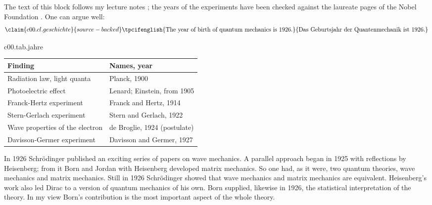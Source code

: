 \begin{vertiefung}[id=c00.v2,
    titel={Names and dates},
    wozu={The Core names the findings without their history. Here are the dates and names,
      for those who want to tell the story.},
    voraussetzung={Section~\ref{c00.s4}. The rest of the course does not need this block.},
    zurueck={The mathematical form of quantum mechanics and its statistical interpretation
      arose in the years 1925 to 1927.}]
  The text of this block follows my lecture notes ; the years of the experiments have been checked against the laureate pages of
  the Nobel Foundation . One can argue
  well:
  \begin{equation}\label{c00.eq.geburtsjahr}\claim{c00.cl.geschichte}{source-backed}
    \text{\tpcifenglish{The year of birth of quantum mechanics is 1926.}{Das Geburtsjahr der Quantenmechanik ist 1926.}}
  \end{equation}

  \begin{tpctable}{c00.tab.jahre}
    \caption{Dates and names for the findings of Section~\ref{c00.s4}. The years follow the
      laureate pages of the Nobel Foundation and, for Davisson and Germer, the year their
      paper appeared in the Physical Review.}
    \begin{tabular}{ll}
      \toprule
      Finding & Names, year \\
      \midrule
      Radiation law, light quanta & Planck, 1900 \\
      Photoelectric effect & Lenard; Einstein, from 1905 \\
      Franck-Hertz experiment & Franck and Hertz, 1914 \\
      Stern-Gerlach experiment & Stern and Gerlach, 1922 \\
      Wave properties of the electron & de Broglie, 1924 (postulate) \\
      Davisson-Germer experiment & Davisson and Germer, 1927 \\
      \bottomrule
    \end{tabular}
  \end{tpctable}

  In 1926 Schrödinger published an exciting series of papers on wave mechanics. A parallel
  approach began in 1925 with reflections by Heisenberg; from it Born and Jordan with
  Heisenberg developed matrix mechanics. So one had, as it were, two quantum theories, wave
  mechanics and matrix mechanics. Still in 1926 Schrödinger showed that wave mechanics and
  matrix mechanics are equivalent. Heisenberg's work also led Dirac to a version of quantum
  mechanics of his own. Born supplied, likewise in 1926, the statistical interpretation of
  the theory. In my view Born's contribution is the
  most important aspect of the whole theory.


\end{vertiefung}
